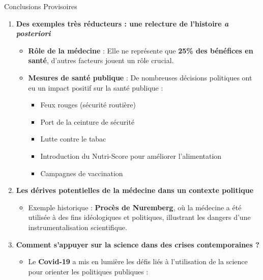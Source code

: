 \documentclass[
  ignorenonframetext,
]{beamer}
\providecommand{\tightlist}{%
  \setlength{\itemsep}{0pt}\setlength{\parskip}{0pt}}\usepackage{longtable,booktabs,array}
\begin{document}
\begin{frame}{Conclusions Provisoires}
\protect\hypertarget{conclusions-provisoires}{}
\begin{enumerate}
\tightlist
\item
  \textbf{Des exemples très réducteurs : une relecture de l'histoire
  \emph{a posteriori}}

  \begin{itemize}
  \tightlist
  \item
    \textbf{Rôle de la médecine} : Elle ne représente que \textbf{25\%
    des bénéfices en santé}, d'autres facteurs jouent un rôle crucial.\\
  \item
    \textbf{Mesures de santé publique} : De nombreuses décisions
    politiques ont eu un impact positif sur la santé publique :

    \begin{itemize}
    \tightlist
    \item
      Feux rouges (sécurité routière)\\
    \item
      Port de la ceinture de sécurité\\
    \item
      Lutte contre le tabac\\
    \item
      Introduction du Nutri-Score pour améliorer l'alimentation\\
    \item
      Campagnes de vaccination
    \end{itemize}
  \end{itemize}
\item
  \textbf{Les dérives potentielles de la médecine dans un contexte
  politique}

  \begin{itemize}
  \tightlist
  \item
    Exemple historique : \textbf{Procès de Nuremberg}, où la médecine a
    été utilisée à des fins idéologiques et politiques, illustrant les
    dangers d'une instrumentalisation scientifique.
  \end{itemize}
\item
  \textbf{Comment s'appuyer sur la science dans des crises
  contemporaines ?}

  \begin{itemize}
  \tightlist
  \item
    Le \textbf{Covid-19} a mis en lumière les défis liés à l'utilisation
    de la science pour orienter les politiques publiques :


\end{itemize}
\end{enumerate}
\end{frame}
\end{document}
